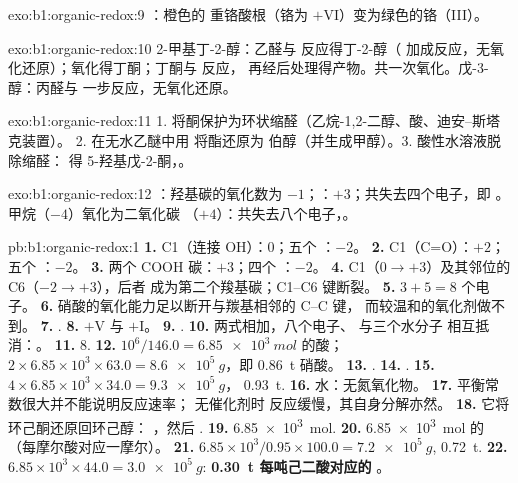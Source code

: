 \begin{solution}{exo:b1:organic-redox:9}
：橙色的
重铬酸根（铬为 $+$VI）变为绿色的铬（III）。
\end{solution}

\begin{solution}{exo:b1:organic-redox:10}
2-甲基丁-2-醇：乙醛与  反应得丁-2-醇（
加成反应，无氧化还原）；氧化得丁酮；丁酮与  反应，
再经后处理得产物。共一次氧化。戊-3-醇：丙醛与 
一步反应，无氧化还原。
\end{solution}

\begin{solution}{exo:b1:organic-redox:11}
1. 将酮保护为环状缩醛（乙烷-1,2-二醇、酸、迪安–斯塔克装置）。
2. 在无水乙醚中用  将酯还原为
伯醇（并生成甲醇）。3. 酸性水溶液脱除缩醛：
得 5-羟基戊-2-酮，。
\end{solution}

\begin{solution}{exo:b1:organic-redox:12}
：羟基碳的氧化数为 $-1$；：$+3$；共失去四个电子，即
。甲烷（$-4$）氧化为二氧化碳
（$+4$）：共失去八个电子，。
\end{solution}

\begin{solution}{pb:b1:organic-redox:1}
\textbf{1.} C1（连接 OH）：0；五个 ：$-2$。
\textbf{2.} C1（C=O）：$+2$；五个 ：$-2$。
\textbf{3.} 两个 COOH 碳：$+3$；四个 ：$-2$。
\textbf{4.} C1（$0 \to +3$）及其邻位的 C6（$-2 \to +3$），后者
成为第二个羧基碳；C1--C6 键断裂。
\textbf{5.} $3 + 5 = 8$ 个电子。
\textbf{6.} 硝酸的氧化能力足以断开与羰基相邻的 C--C 键，
而较温和的氧化剂做不到。
\textbf{7.} .
\textbf{8.} $+$V 与 $+$I。
\textbf{9.} .
\textbf{10.} 两式相加，八个电子、 与三个水分子
相互抵消：。
\textbf{11.} 8.
\textbf{12.} $10^6/146.0 = \qty{6.85e3}{mol}$ 的酸；$2 \times 6.85 \times
10^3 \times 63.0 = \qty{8.6e5}{g}$，即 \qty{0.86}{t} 硝酸。
\textbf{13.} .
\textbf{14.} .
\textbf{15.} $4 \times 6.85 \times 10^3 \times 34.0 = \qty{9.3e5}{g}$，
\qty{0.93}{t}.
\textbf{16.} 水：无氮氧化物。
\textbf{17.} 平衡常数很大并不能说明反应速率；
无催化剂时  反应缓慢，其自身分解亦然。
\textbf{18.} 它将环己酮还原回环己醇：
，然后
.
\textbf{19.} \qty{6.85e3}{mol}.
\textbf{20.} \qty{6.85e3}{mol} 的 （每摩尔酸对应一摩尔）。
\textbf{21.} $6.85 \times 10^3/0.95 \times 100.0 = \qty{7.2e5}{g}$, \qty{0.72}{t}.
\textbf{22.} $6.85 \times 10^3 \times 44.0 = \qty{3.0e5}{g}$: \textbf{\qty{0.30}{t}
每吨己二酸对应的 }。
\end{solution}
